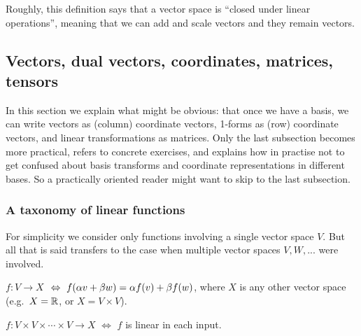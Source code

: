 Roughly, this definition says that a vector space is ``closed under
linear operations'', meaning that we can add and scale vectors and
they remain vectors.


\subsection{Vectors, dual vectors, coordinates, matrices, tensors}

In this section we explain what might be obvious: that once we have a
basis, we can write vectors as (column) coordinate vectors, 1-forms as
(row) coordinate vectors, and linear transformations as matrices. Only
the last subsection becomes more practical, refers to concrete
exercises, and explains how in practise not to get confused about
basis transforms and coordinate representations in different bases. So
a practically oriented reader might want to skip to the last
subsection.


\subsubsection{A taxonomy of linear functions}

For simplicity we consider only functions involving a single vector
space $V$. But all that is said transfers to the case when multiple
vector spaces $V, W, ...$ were involved.

\begin{myDefinition}
$f:V \to X$  $~\Leftrightarrow~ f(\alpha v+\beta w) = \alpha f(v) + \beta f(w)$,
where $X$ is any other vector space (e.g.\ $X={\mathbb{R}}$, or $X=V\times V$).
\end{myDefinition}

\begin{myDefinition}
$f: V \times V \times \cdots \times V \to X$ 
$\iff$ $f$ is linear in each input.
\end{myDefinition}

